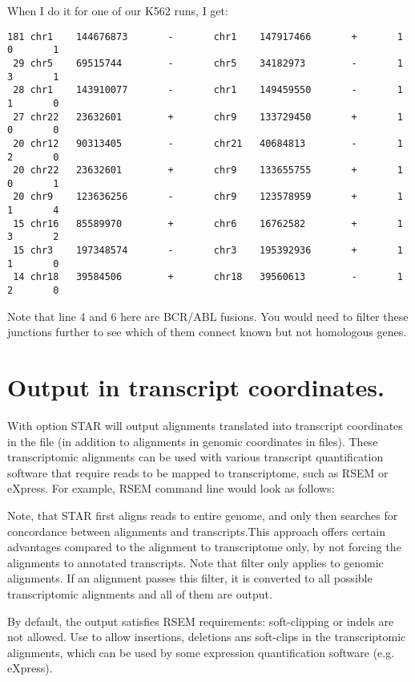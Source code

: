 \documentclass[12pt]{article}
\begin{document}
When I do it for one of our K562 runs, I get:
\begin{verbatim}
181 chr1    144676873       -       chr1    147917466       +       1       0       1
 29 chr5    69515744        -       chr5    34182973        -       1       3       1
 28 chr1    143910077       -       chr1    149459550       -       1       1       0
 27 chr22   23632601        +       chr9    133729450       +       1       0       0
 20 chr12   90313405        -       chr21   40684813        -       1       2       0
 20 chr22   23632601        +       chr9    133655755       +       1       0       1
 20 chr9    123636256       -       chr9    123578959       +       1       1       4
 15 chr16   85589970        +       chr6    16762582        +       1       3       2
 15 chr3    197348574       -       chr3    195392936       +       1       1       0
 14 chr18   39584506        +       chr18   39560613        -       1       2       0
\end{verbatim}
Note that line 4 and 6 here are BCR/ABL fusions. You would need to filter these junctions further to see which of them connect known but not homologous genes.


\section{Output in transcript coordinates.}
With   option STAR will output alignments translated into transcript coordinates in the  file (in addition to alignments in genomic coordinates in  files). These transcriptomic alignments can be used with various transcript quantification software that require reads to be mapped to transcriptome, such as RSEM or eXpress. For example, RSEM command line would look as follows: 

Note, that STAR first aligns reads to entire genome, and only then searches for concordance between alignments and transcripts.This approach offers certain advantages compared to the alignment to transcriptome only, by not forcing the alignments to annotated transcripts. Note that  filter only applies to genomic alignments. If an alignment passes this filter, it is converted to all possible transcriptomic alignments and all of them are output.

By default, the output satisfies RSEM requirements: soft-clipping or indels are not allowed. Use   to allow insertions, deletions ans soft-clips in the transcriptomic alignments, which can be used by some expression quantification software (e.g. eXpress).
\end{document}
